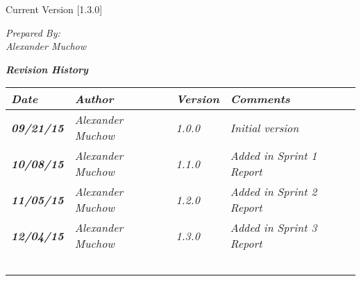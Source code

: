 


Current Version [1.3.0]
\vspace*{5mm}

{\color{MSBlue3}
\noindent
\textit{Prepared By:}\\
\textit{Alexander Muchow}\\
}

\vfill
\noindent
{\color{color02} \textit{\textbf{Revision History}}}\\
\begin{tabular}{|>{\raggedright}p{1.5cm}|>{\raggedright}p{3cm}|>{\raggedright}p{1.5cm}|>{\raggedright}p{9cm}|}
\hline
\textit{\textbf{Date}} &  \textit{\textbf{Author}} & \textit{\textbf{Version}} & \textit{\textbf{Comments}}\tabularnewline
\hline
 \textit{\textbf{09/21/15}} & \textit{Alexander Muchow} & \textit{1.0.0} & \textit{Initial version}\tabularnewline
\hline
\textit{\textbf{10/08/15}} & \textit{Alexander Muchow} & \textit{1.1.0} & \textit{Added in Sprint 1 Report }\tabularnewline
\hline
\textit{\textbf{11/05/15}} & \textit{Alexander Muchow} & \textit{1.2.0} & \textit{Added in Sprint 2 Report }\tabularnewline
\hline
\textit{\textbf{12/04/15}} & \textit{Alexander Muchow} & \textit{1.3.0} & \textit{Added in Sprint 3 Report }\tabularnewline
\hline
 &  &  & \tabularnewline
 \hline
 &  &  & \tabularnewline
\hline
 &  &  & \tabularnewline
\hline
 &  &  & \tabularnewline
\hline
 &  &  & \tabularnewline
\hline
\end{tabular}
\vfill

